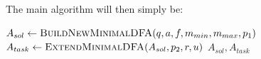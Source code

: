 \noindent The main algorithm will then simply be:
\vspace{0.2cm}
\begin{algorithmic}[1]
	\State $A_{sol} \gets \textsc{BuildNewMinimalDFA}(q, a, f, m_{min}, m_{max}, p_1)$
	\State $A_{task} \gets \textsc{ExtendMinimalDFA}(A_{sol}, p_2, r, u)$
	\State \Return $A_{sol}, A_{task}$
	\EndFunction
\end{algorithmic}


